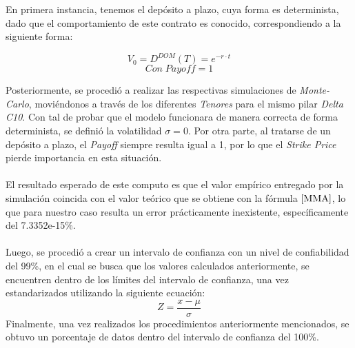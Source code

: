 \noindent En primera instancia, tenemos el depósito a plazo, cuya forma es determinista, dado que el comportamiento de este contrato es conocido, correspondiendo a la siguiente forma:

\begin{equation}
    V_0=D^{DOM}(T)=e^{-r\cdot t}
    \label{MMA}
\end{equation}
\begin{equation*}
    Con \;Payoff=1
\end{equation*}

\noindent Posteriormente, se procedió a realizar las respectivas simulaciones de \textit{Monte-Carlo}, moviéndonos a través de los diferentes \textit{Tenores} para el mismo pilar \textit{Delta} \textit{C10}. Con tal de probar que el modelo funcionara de manera correcta de forma determinista, se definió la volatilidad $\sigma=0$. Por otra parte, al tratarse de un depósito a plazo, el \textit{Payoff} siempre resulta igual a 1, por lo que el \textit{Strike Price} pierde importancia en esta situación.\\\\
\noindent El resultado esperado de este computo es que el valor empírico entregado por la simulación coincida con el valor teórico que se obtiene con la fórmula $\ref{MMA}$, lo que para nuestro caso resulta un error prácticamente inexistente, específicamente del 7.3352e-15\%.\\\\
\noindent Luego, se procedió a crear un intervalo de confianza con un nivel de confiabilidad del 99\%, en el cual se busca que los valores calculados anteriormente, se encuentren dentro de los límites del intervalo de confianza, una vez estandarizados utilizando la siguiente ecuación:
\begin{equation}
    Z=\frac{x-\mu}{\sigma}
\end{equation}
\noindent Finalmente, una vez realizados los procedimientos anteriormente mencionados, se obtuvo un porcentaje de datos dentro del intervalo de confianza del 100\%.
\newpage
